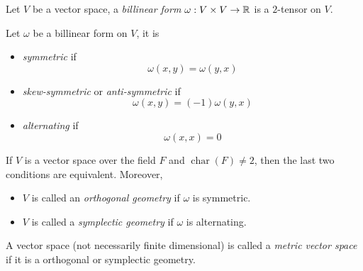 \documentclass[../main-manifolds.tex]{subfiles}
\begin{document}
    \begin{definition}
        Let $V$ be a vector space, a \emph{billinear form} $\omega: V\times V\to \mathbb{R}$ is a $2$-tensor on $V$.
    \end{definition}
    
    \begin{definition}
        Let $\omega$ be a billinear form on $V$, it is 
        \begin{itemize}
            \item \emph{symmetric} if 
            \[
                \omega(x,y) = \omega(y,x)
            \]
            \item \emph{skew-symmetric} or \emph{anti-symmetric} if 
            \[
                \omega(x,y) = (-1)\omega(y,x)
            \]
            \item \emph{alternating} if
            \[
                \omega(x,x)=0
            \]
        \end{itemize}
        If $V$ is a vector space over the field $F$ and $\operatorname{char}(F)\neq 2$, then the last two conditions are equivalent. Moreover, 
        \begin{itemize}
            \item $V$ is called an \emph{orthogonal geometry} if $\omega$ is symmetric.
            \item $V$ is called a \emph{symplectic geometry} if $\omega$ is alternating.
        \end{itemize}
    \end{definition}

    \begin{definition}
        A vector space (not necessarily finite dimensional) is called a \emph{metric vector space} if it is a orthogonal or symplectic geometry.
    \end{definition}


\end{document}
